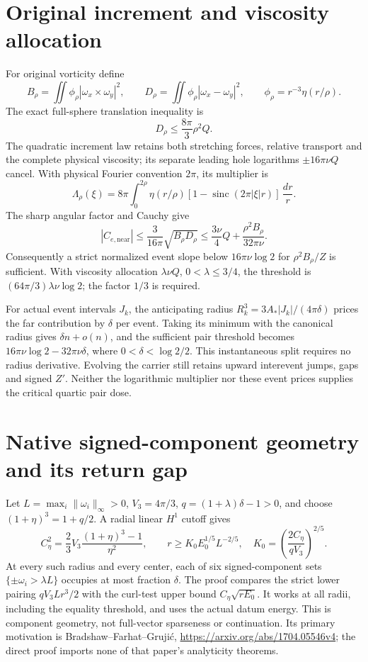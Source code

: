 \documentclass[11pt]{article}
\begin{document}
\section{Original increment and viscosity allocation}
For original vorticity define
\[
 B_\rho=\iint\phi_\rho|\omega_x\times\omega_y|^2,\qquad
 D_\rho=\iint\phi_\rho|\omega_x-\omega_y|^2,
 \qquad\phi_\rho=r^{-3}\eta(r/\rho).
\]
The exact full-sphere translation inequality is
\[
 D_\rho\le\frac{8\pi}{3}\rho^2Q.
\]
The quadratic increment law retains both
stretching forces, relative transport and the complete physical viscosity;
its separate leading hole logarithms $\pm16\pi\nu Q$ cancel.
With physical Fourier convention $2\pi$, its multiplier is
\[
 \Lambda_\rho(\xi)=8\pi\int_0^{2\rho}
 \eta(r/\rho)[1-\operatorname{sinc}(2\pi|\xi|r)]\,\frac{dr}{r}.
\]
The sharp angular factor and Cauchy give
\[
 |C_{e,\mathrm{near}}|\le\frac3{16\pi}\sqrt{B_\rho D_\rho}
 \le\frac{3\nu}{4}Q+\frac{\rho^2 B_\rho}{32\pi\nu}.
\]
Consequently a strict normalized event slope below $16\pi\nu\log2$
for $\rho^2B_\rho/Z$ is sufficient. With viscosity allocation
$\lambda\nu Q$, $0<\lambda\le3/4$, the threshold is
$(64\pi/3)\lambda\nu\log2$; the factor $1/3$ is required.

For actual event intervals $J_k$, the anticipating radius
$R_k^3=3A_*|J_k|/(4\pi\delta)$ prices the far contribution by
$\delta$ per event. Taking its minimum with the canonical radius
gives $\delta n+o(n)$, and the sufficient pair threshold becomes
$16\pi\nu\log2-32\pi\nu\delta$, where $0<\delta<\log2/2$.
This instantaneous split requires no radius derivative. Evolving the
carrier still retains upward interevent jumps, gaps and signed $Z'$.
Neither the logarithmic multiplier nor these event prices supplies the
critical quartic pair dose.

\section{Native signed-component geometry and its return gap}
Let $L=\max_i\|\omega_i\|_\infty>0$, $V_3=4\pi/3$,
$q=(1+\lambda)\delta-1>0$, and choose
$(1+\eta)^3=1+q/2$. A radial linear $H^1$ cutoff gives
\[
 C_\eta^2=\frac23 V_3\frac{(1+\eta)^3-1}{\eta^2},\qquad
 r\ge K_0E_0^{1/5}L^{-2/5},\quad
 K_0=\left(\frac{2C_\eta}{qV_3}\right)^{2/5}.
\]
At every such radius and every center, each of six signed-component
sets $\{\pm\omega_i>\lambda L\}$ occupies at most fraction $\delta$.
The proof compares the strict lower pairing $qV_3Lr^3/2$ with the
curl-test upper bound $C_\eta\sqrt{rE_0}$. It works at all radii,
including the equality threshold, and uses the actual datum energy.
This is component geometry, not full-vector sparseness or continuation.
Its primary motivation is Bradshaw--Farhat--Gruji\'c,
\url{https://arxiv.org/abs/1704.05546v4}; the direct proof imports
none of that paper's analyticity theorems.
\end{document}
